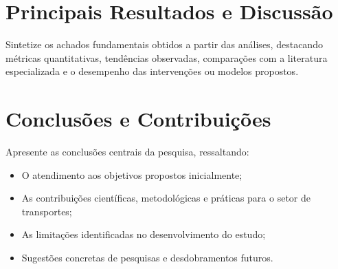 \begin{otherlanguage}{brazilian}
\section*{Principais Resultados e Discussão}

Sintetize os achados fundamentais obtidos a partir das análises, destacando métricas quantitativas, tendências observadas, comparações com a literatura especializada e o desempenho das intervenções ou modelos propostos.

\section*{Conclusões e Contribuições}

Apresente as conclusões centrais da pesquisa, ressaltando:
\begin{itemize}
    \item O atendimento aos objetivos propostos inicialmente;
    \item As contribuições científicas, metodológicas e práticas para o setor de transportes;
    \item As limitações identificadas no desenvolvimento do estudo;
    \item Sugestões concretas de pesquisas e desdobramentos futuros.
\end{itemize}

\end{otherlanguage}

